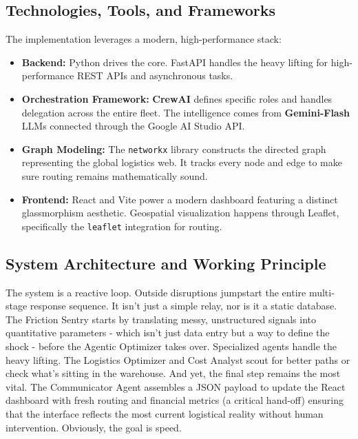 \subsection{Technologies, Tools, and Frameworks}
The implementation leverages a modern, high-performance stack:
\begin{itemize}
    \item \textbf{Backend:} Python drives the core. FastAPI handles the heavy lifting for high-performance REST APIs and asynchronous tasks.
    \item \textbf{Orchestration Framework:} \textbf{CrewAI} defines specific roles and handles delegation across the entire fleet. The intelligence comes from \textbf{Gemini-Flash} LLMs connected through the Google AI Studio API.
    \item \textbf{Graph Modeling:} The \texttt{networkx} library constructs the directed graph representing the global logistics web. It tracks every node and edge to make sure routing remains mathematically sound.
    \item \textbf{Frontend:} React and Vite power a modern dashboard featuring a distinct glassmorphism aesthetic. Geospatial visualization happens through Leaflet, specifically the \texttt{leaflet} integration for routing.
\end{itemize}

\subsection{System Architecture and Working Principle}
The system is a reactive loop. Outside disruptions jumpstart the entire multi-stage response sequence. It isn't just a simple relay, nor is it a static database. The Friction Sentry starts by translating messy, unstructured signals into quantitative parameters - which isn't just data entry but a way to define the shock - before the Agentic Optimizer takes over. Specialized agents handle the heavy lifting. The Logistics Optimizer and Cost Analyst scout for better paths or check what's sitting in the warehouse. And yet, the final step remains the most vital. The Communicator Agent assembles a JSON payload to update the React dashboard with fresh routing and financial metrics (a critical hand-off) ensuring that the interface reflects the most current logistical reality without human intervention. Obviously, the goal is speed.

